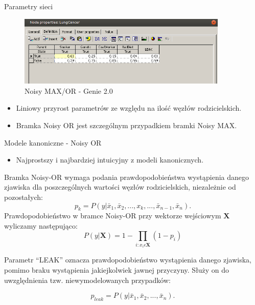 \documentclass{beamer}
\begin{document}
\begin{frame}{Parametry sieci}
	\begin{figure}[h!]
		\centering
		\includegraphics[width=10cm]{3.png}
		\caption{Noisy MAX/OR - Genie 2.0}
	\end{figure}

	\begin{itemize}
		\item Liniowy przyrost parametrów ze względu na ilość węzłów rodzicielskich.
		\item Bramka Noisy OR jest szczególnym przypadkiem bramki Noisy MAX.
	\end{itemize}
\end{frame}

\begin{frame}{Modele kanoniczne - Noisy OR}
	\begin{itemize}
		\item Najprostszy i najbardziej intuicyjny z modeli kanonicznych.
	\end{itemize}
	Bramka Noisy-OR wymaga podania prawdopodobieństwa wystąpienia danego zjawiska dla poszczególnych wartości węzłów rodzicielskich, niezależnie od pozostałych:
	\begin{equation}
		p_k = P(y|\bar{x}_1, \bar{x}_2, ... , x_k, ... , \bar{x}_{n-1}, \bar{x}_n).
	\end{equation}
	Prawdopodobieństwo w bramce Noisy-OR przy wektorze wejściowym $\textbf{X}$ wyliczamy następująco:
	\begin{equation}
		P(y|\textbf{X}) = 1 - \prod_{i:x_i\epsilon \textbf{X}}(1-p_i)
	\end{equation}

	Parametr ``LEAK'' oznacza prawdopodobieństwo wystąpienia danego zjawiska, pomimo braku wystąpienia jakiejkolwiek jawnej przyczyny. 
	Służy on do uwzględnienia tzw. niewymodelowanych przypadków:

	\begin{equation}
		p_{leak} = P(y|\bar{x}_1, \bar{x}_2, ... , \bar{x}_n).
	\end{equation}
\end{frame}
\end{document}

